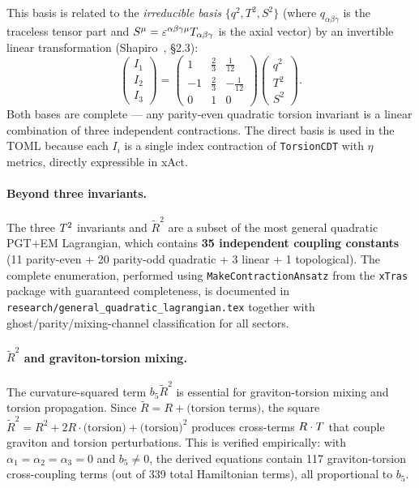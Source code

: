 This basis is related to the \emph{irreducible basis} $\{q^2, T^2, S^2\}$ (where $q_{\alpha\beta\gamma}$ is the traceless tensor part and $S^\mu = \varepsilon^{\alpha\beta\gamma\mu} T_{\alpha\beta\gamma}$ is the axial vector) by an invertible linear transformation (Shapiro~\cite{shapiro2002torsion}, \S2.3):
\begin{equation}
  \begin{pmatrix} I_1 \\ I_2 \\ I_3 \end{pmatrix}
  = \begin{pmatrix}
    1 & \tfrac{2}{3} & \tfrac{1}{12} \\
    -1 & \tfrac{2}{3} & -\tfrac{1}{12} \\
    0 & 1 & 0
  \end{pmatrix}
  \begin{pmatrix} q^2 \\ T^2 \\ S^2 \end{pmatrix}.
  \label{eq:basis-transform}
\end{equation}
Both bases are complete --- any parity-even quadratic torsion invariant is a linear combination of three independent contractions.  The direct basis is used in the TOML because each $I_i$ is a single index contraction of \texttt{TorsionCDT} with $\eta$ metrics, directly expressible in xAct.

\paragraph{Beyond three invariants.}
The three $T^2$ invariants and $\tilde{R}^2$ are a subset of the most general quadratic PGT+EM Lagrangian, which contains \textbf{35 independent coupling constants} (11 parity-even + 20 parity-odd quadratic + 3 linear + 1 topological).  The complete enumeration, performed using \texttt{MakeContractionAnsatz} from the \texttt{xTras} package with guaranteed completeness, is documented in \texttt{research/general\_quadratic\_lagrangian.tex} together with ghost/parity/mixing-channel classification for all sectors.

\paragraph{$\tilde{R}^2$ and graviton-torsion mixing.}
The curvature-squared term $b_5 \tilde{R}^2$ is essential for graviton-torsion mixing and torsion propagation.  Since $\tilde{R} = R + \text{(torsion terms)}$, the square $\tilde{R}^2 = R^2 + 2R \cdot \text{(torsion)} + \text{(torsion)}^2$ produces cross-terms $R \cdot T$ that couple graviton and torsion perturbations.  This is verified empirically: with $\alpha_1 = \alpha_2 = \alpha_3 = 0$ and $b_5 \neq 0$, the derived equations contain 117 graviton-torsion cross-coupling terms (out of 339 total Hamiltonian terms), all proportional to $b_5$.

